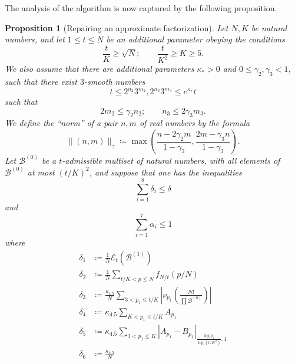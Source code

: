 \documentclass[10pt,a4paper,reqno]{amsart}
\numberwithin{equation}{section}
\theoremstyle{plain}
\newtheorem{proposition}[theorem]{Proposition}
\theoremstyle{definition}
\newcommand\tuple{{\mathcal B}}
\newcommand\excess{{\mathcal{E}}}
\begin{document}
The analysis of the algorithm is now captured by the following proposition.

\begin{proposition}[Repairing an approximate factorization]\label{repair}  Let $N, K$ be natural numbers, and let $1 \leq t \leq N$ be an additional parameter obeying the conditions
\begin{equation}\label{conditions}
    \frac{t}{K} \geq \sqrt{N}; \qquad \frac{t}{K^2} \geq K \geq 5.
\end{equation}
We also assume that there are additional parameters $\kappa_* > 0$ and $0 \leq \gamma_2, \gamma_3 < 1$, such that there exist $3$-smooth numbers
\begin{equation}\label{tlip} 
  t \leq 2^{n_2} 3^{m_2}, 2^{n_3} 3^{m_3} \leq e^{\kappa_*} t
\end{equation}
such that
\begin{equation}\label{nm}
  2m_2 \leq \gamma_2 n_2; \qquad n_3 \leq 2\gamma_3 m_3.
\end{equation}
We define the ``norm'' of a pair $n,m$ of real numbers by the formula
$$ \| (n,m) \|_\gamma \coloneqq \max\left( \frac{n-2\gamma_2 m}{1-\gamma_2}, \frac{2m-\gamma_3 n}{1-\gamma_3} \right).$$
Let $\tuple^{(0)}$ be a $t$-admissible multiset of natural numbers, with all elements of $\tuple^{(0)}$ at most $(t/K)^2$, and suppose that one has the inequalities
\begin{equation}\label{delta-cond}
\sum_{i=1}^8 \delta_i \leq \delta
\end{equation}
and
\begin{equation}\label{alpha-cond}
  \sum_{i=1}^7 \alpha_i \leq 1
\end{equation} 
where
\begin{align}
\delta_1 &\coloneqq \frac{1}{N} \excess_t(\tuple^{(1)}) \label{delta1-def}  \\
\delta_2 &\coloneqq \frac{1}{N} \sum_{t/K < p \leq N} f_{N/t}(p/N) \label{delta2-def}  \\
\delta_3 &\coloneqq \frac{\kappa_{4.5}}{N}  \sum_{3 < p_1 \leq t/K} \left|\nu_{p_1}\left( \frac{N!}{\prod \tuple^{(0)}} \right)\right| \label{delta3-def}  \\
\delta_4 &\coloneqq \kappa_{4.5} \sum_{K < p_1 \leq t/K} A_{p_1} \label{delta4-def}  \\
\delta_5 &\coloneqq \kappa_{4.5} \sum_{3 < p_1 \leq K} |A_{p_1} - B_{p_1}|_{\frac{\log p_1}{\log(t/K^2)},1} \label{delta5-def}  \\
\delta_6 &\coloneqq \frac{\kappa_{4.5}}{N} \label{delta6-def}  \\

\end{align}
\end{proposition}
\end{document}
